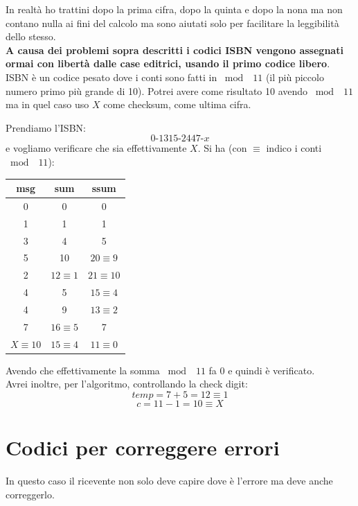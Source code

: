 \documentclass[a4paper,12pt, oneside]{book}
\begin{document}
In realtà ho trattini dopo la prima cifra, dopo la quinta e dopo la nona ma non
contano nulla ai fini del calcolo ma sono aiutati solo per facilitare la
leggibilità dello stesso.\\
\textbf{A causa dei problemi sopra descritti i codici ISBN vengono assegnati
  ormai con libertà dalle case editrici, usando il primo codice libero}.\\
ISBN è un codice pesato dove i conti sono
fatti in $\bmod\,\,\,11$ (il più piccolo numero primo più grande di 10). Potrei
avere come risultato 10 avendo $\bmod\,\,\,11$ ma in quel caso uso $X$ come
checksum, come ultima cifra.
\begin{esempio}
  Prendiamo l'ISBN:
  \[0\mbox{-}1315\mbox{-}2447\mbox{-} x\]
  e vogliamo verificare che sia effettivamente $X$. Si ha (con $\equiv$ indico i
  conti $\bmod\,\,\,11$):
  \begin{table}[H]
    \centering
    \begin{tabular}{|c|c|c|}
      \hline
      msg & sum & ssum \\
      \hline
      0 & 0 & 0\\
      1 & 1 & 1\\
      3  & 4 & 5\\
      5 & 10 & $20\equiv 9$\\
      2& $12\equiv 1$ & $21\equiv 10$\\
      4 & 5 & $15\equiv 4$\\
      4 & 9 & $13\equiv 2$\\
      7 & $16\equiv 5$ & 7\\
      \hline
      $X\equiv 10$ & $15\equiv 4$ & $11\equiv 0$\\
      \hline
    \end{tabular}
  \end{table}
  Avendo che effettivamente la somma $\bmod\,\,\,11$ fa 0 e quindi è
  verificato.\\ 
  Avrei inoltre, per l'algoritmo, controllando la check digit:
  \[temp = 7+5=12\equiv 1\]
  \[c=11-1=10\equiv X\]
\end{esempio}
\section{Codici per correggere errori}
In questo caso il ricevente non solo deve capire dove è l'errore ma deve anche
correggerlo. 
\end{document}
